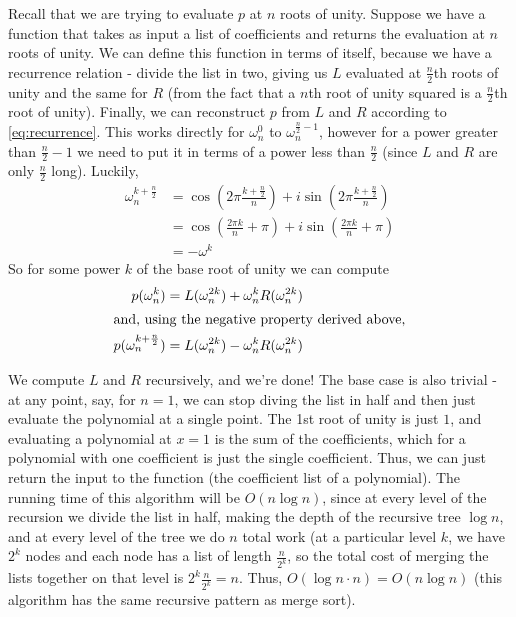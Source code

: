 \documentclass[11pt, oneside]{article}
\theoremstyle{plain}
\theoremstyle{definition}
\begin{document}
Recall that we are trying to evaluate \( p \) at \( n \) roots of unity.
Suppose we have a function that takes as input a list of coefficients
and returns the evaluation at \( n \) roots of unity.
We can define this function in terms of itself, because we have a recurrence
relation - divide the list in two, giving us \( L \) evaluated at 
\( \frac{n}{2} \)th roots of unity and the same for \( R \)
(from the fact that a \( n \)th root of unity squared is a \( \frac{n}{2} \)th
root of unity). Finally, we can reconstruct \( p \) from \( L \) and \( R \)
according to \eqref{eq:recurrence}. This works directly for \( \omega^0_n \)
to \( \omega^{\frac{n}{2} - 1}_n \), however for a power greater than
\( \frac{n}{2} - 1 \) we need to put it in terms of a power less than
\( \frac{n}{2} \) (since \( L \) and \( R \) are only \( \frac{n}{2} \) long).
Luckily, 
\begin{align*}
  \omega^{k + \frac{n}{2}}_n &= \cos(2 \pi \frac{k + \frac{n}{2}}{n}) +
  i \sin(2 \pi \frac{k + \frac{n}{2}}{n}) \\
                             &= \cos(\frac{2 \pi k}{n} + \pi) +
                             i \sin(\frac{2 \pi k}{n} + \pi) \\
                             &= -\omega^k
\end{align*}
So for some power \( k \) of the base root of unity we can compute
\begin{align*}
  p(\omega^k_n) &= L(\omega^{2k}_n) + \omega^k_n R(\omega^{2k}_n) \\
  \shortintertext{and, using the negative property derived above,}
  p(\omega^{k + \frac{n}{2}}_n) &= L(\omega^{2k}_n) - \omega^k_n R(\omega^{2k}_n) \\
\end{align*}

We compute \( L \) and \( R \) recursively, and we're done!
The base case is also trivial - at any point, say, for \( n = 1 \), we can
stop diving the list in half and then just evaluate the polynomial
at a single point. The 1st root of unity is just \( 1 \), and evaluating
a polynomial at \( x = 1 \) is the sum of the coefficients, which for a
polynomial with one coefficient is just the single coefficient. Thus, we can
just return the input to the function (the coefficient list of a polynomial).
The running time of this algorithm will be \( O(n \log n ) \), since at every
level of the recursion we divide the list in half, making the depth of the
recursive tree \( \log n \), and at every level of the tree we do \( n \) 
total work (at a particular level \( k \), we have \( 2^k \) nodes and
each node has a list of length \( \frac{n}{2^k} \), so the total cost of
merging the lists together on that level is \( 2^k \frac{n}{2^k} = n \).
Thus, \( O(\log n \cdot n) = O(n \log n) \) (this algorithm has the same
recursive pattern as merge sort).
\end{document}

